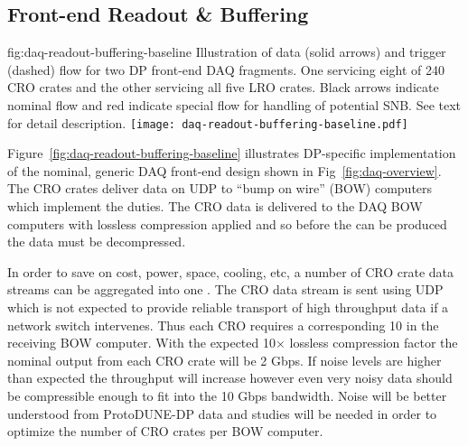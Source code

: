 \subsection{Front-end Readout \& Buffering}
\label{sec:fd-daq-fero}


\begin{dunefigure}{fig:daq-readout-buffering-baseline}
  {Illustration of data (solid arrows) and trigger (dashed) flow for
    two DP front-end DAQ fragments. 
    One servicing eight of 240 CRO crates and the other servicing all
    five LRO crates.  
    Black arrows indicate nominal flow and red indicate special flow
    for handling of potential SNB. 
    See text for detail description.}
  \texttt{[image: daq-readout-buffering-baseline.pdf]}%
\end{dunefigure}

Figure~\ref{fig:daq-readout-buffering-baseline} illustrates
DP-specific implementation of the nominal, generic DAQ front-end
 design shown in Fig~\ref{fig:daq-overview}. 
The CRO crates deliver data on UDP to ``bump on wire'' (BOW) computers
which implement the  duties.
The CRO data is delivered to the DAQ BOW computers with lossless
compression applied and so before the  can be
produced the data must be decompressed. 

In order to save on cost, power, space, cooling, etc, a number of CRO
crate data streams can be aggregated into one . 
The CRO data stream is sent using UDP which is not expected to provide
reliable transport of high throughput data if a network switch
intervenes. 
Thus each CRO requires a corresponding \SI{10}{\Gbps}  in the receiving
BOW computer.
With the expected 10$\times$ lossless compression factor the nominal
output from each CRO crate will be 2 Gbps. 
If noise levels are higher than expected the throughput will increase
however even very noisy data should be compressible enough to fit into
the 10 Gbps bandwidth. 
Noise will be better understood from ProtoDUNE-DP data and studies
will be needed in order to optimize the number of CRO crates per BOW
computer.

